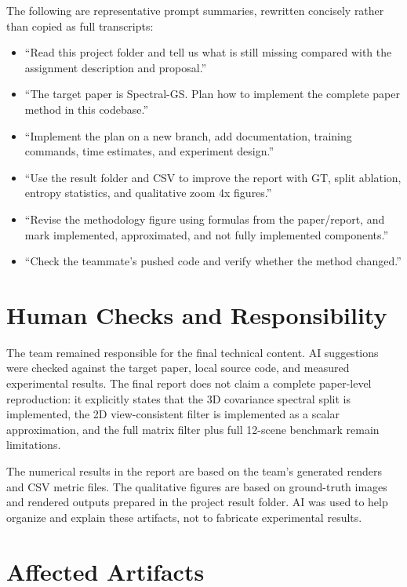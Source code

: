 \documentclass[10pt]{article}
\begin{document}
The following are representative prompt summaries, rewritten concisely rather than copied as full transcripts:
\begin{itemize}
    \item ``Read this project folder and tell us what is still missing compared with the assignment description and proposal.''
    \item ``The target paper is Spectral-GS. Plan how to implement the complete paper method in this codebase.''
    \item ``Implement the plan on a new branch, add documentation, training commands, time estimates, and experiment design.''
    \item ``Use the result folder and CSV to improve the report with GT, split ablation, entropy statistics, and qualitative zoom 4x figures.''
    \item ``Revise the methodology figure using formulas from the paper/report, and mark implemented, approximated, and not fully implemented components.''
    \item ``Check the teammate's pushed code and verify whether the method changed.''
\end{itemize}

\section*{Human Checks and Responsibility}

The team remained responsible for the final technical content. AI suggestions were checked against the target paper, local source code, and measured experimental results. The final report does not claim a complete paper-level reproduction: it explicitly states that the 3D covariance spectral split is implemented, the 2D view-consistent filter is implemented as a scalar approximation, and the full matrix filter plus full 12-scene benchmark remain limitations.

The numerical results in the report are based on the team's generated renders and CSV metric files. The qualitative figures are based on ground-truth images and rendered outputs prepared in the project result folder. AI was used to help organize and explain these artifacts, not to fabricate experimental results.

\section*{Affected Artifacts}
\end{document}
